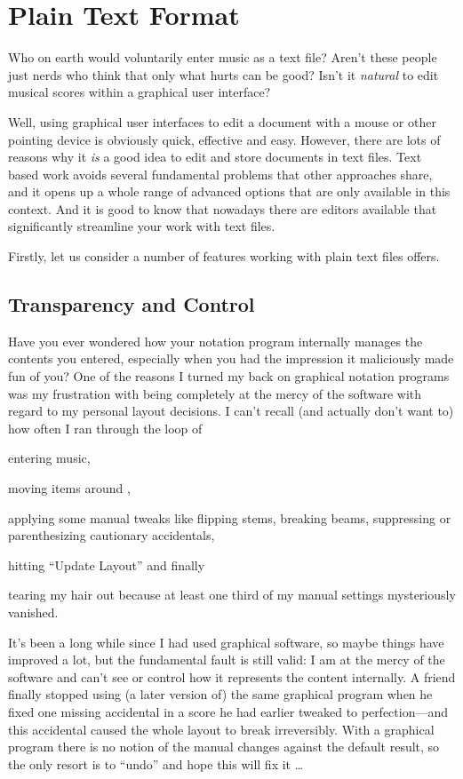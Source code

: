 \documentclass[../../LilyPond-Tutorials]{subfiles}
\begin{document}
\chapter{Plain Text Format}
\label{chap:pt_plain-text-format}
Who on earth would voluntarily enter music as a text file?
Aren't these people just nerds who think that only what hurts can be good?
Isn't it \emph{natural} to edit musical scores within a graphical user interface?

Well, using graphical user interfaces to edit a document with a mouse or other pointing device is obviously quick, effective and easy.
However, there are lots of reasons why it \emph{is} a good idea to edit and store documents in text files.
Text based work avoids several fundamental problems that other approaches share, and it opens up a whole range of advanced options that are only available in this context.
And it is good to know that nowadays there are editors available that significantly streamline your work with text files.

Firstly, let us consider a number of features working with plain text files offers.

\section{Transparency and Control}
\label{sec:pt_transparency-and-control}
Have you ever wondered how your notation program internally manages the contents you entered, especially when you had the impression it maliciously made fun of you?
One of the reasons I turned my back on graphical notation programs was my frustration with being completely at the mercy of the software with regard to my personal layout decisions.
I can't recall (and actually don't want to) how often I ran through the loop of
\begin{inparaenum}[1.)]
\item entering music,
\item moving items around ,
\item applying some manual tweaks like flipping stems, breaking beams, suppressing or parenthesizing cautionary accidentals,
\item hitting “Update Layout” and finally
\item tearing my hair out because at least one third of my manual settings mysteriously vanished.
\end{inparaenum}

It's been a long while since I had used graphical software, so maybe things have improved a lot, but the fundamental fault is still valid: 
I am at the mercy of the software and can't see or control how it represents the content internally.
A friend finally stopped using (a later version of) the same graphical program when he fixed one missing accidental in a score he had earlier tweaked to perfection---and this accidental caused the whole layout to break irreversibly.
With a graphical program there is no notion of the manual changes against the default result, so the only resort is to “undo” and hope this will fix it \dots
\end{document}
